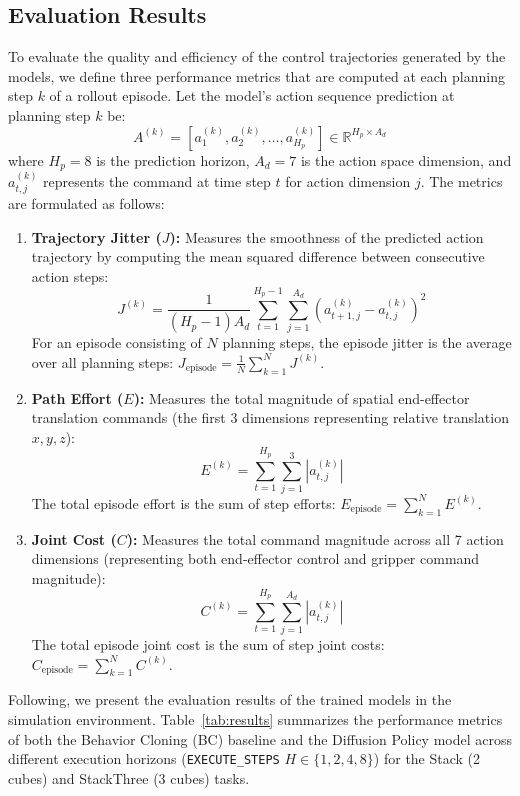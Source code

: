 \documentclass[11pt,a4paper]{article}
\begin{document}
\pagebreak

\subsection{Evaluation Results}

To evaluate the quality and efficiency of the control trajectories generated by the models, we define three performance metrics that are computed at each planning step $k$ of a rollout episode. Let the model's action sequence prediction at planning step $k$ be:
\[ A^{(k)} = \left[ a_1^{(k)}, a_2^{(k)}, \dots, a_{H_p}^{(k)} \right] \in \mathbb{R}^{H_p \times A_d} \]
where $H_p = 8$ is the prediction horizon, $A_d = 7$ is the action space dimension, and $a_{t, j}^{(k)}$ represents the command at time step $t$ for action dimension $j$. The metrics are formulated as follows:

\begin{enumerate}
    \item \textbf{Trajectory Jitter ($J$):} Measures the smoothness of the predicted action trajectory by computing the mean squared difference between consecutive action steps:
    \[ J^{(k)} = \frac{1}{(H_p - 1) A_d} \sum_{t=1}^{H_p-1} \sum_{j=1}^{A_d} \left( a_{t+1, j}^{(k)} - a_{t, j}^{(k)} \right)^2 \]
    For an episode consisting of $N$ planning steps, the episode jitter is the average over all planning steps: $J_{\text{episode}} = \frac{1}{N} \sum_{k=1}^{N} J^{(k)}$.

    \item \textbf{Path Effort ($E$):} Measures the total magnitude of spatial end-effector translation commands (the first 3 dimensions representing relative translation $x, y, z$):
    \[ E^{(k)} = \sum_{t=1}^{H_p} \sum_{j=1}^{3} \left| a_{t, j}^{(k)} \right| \]
    The total episode effort is the sum of step efforts: $E_{\text{episode}} = \sum_{k=1}^{N} E^{(k)}$.

    \item \textbf{Joint Cost ($C$):} Measures the total command magnitude across all 7 action dimensions (representing both end-effector control and gripper command magnitude):
    \[ C^{(k)} = \sum_{t=1}^{H_p} \sum_{j=1}^{A_d} \left| a_{t, j}^{(k)} \right| \]
    The total episode joint cost is the sum of step joint costs: $C_{\text{episode}} = \sum_{k=1}^{N} C^{(k)}$.
\end{enumerate}

Following, we present the evaluation results of the trained models in the simulation environment. Table~\ref{tab:results} summarizes the performance metrics of both the Behavior Cloning (BC) baseline and the Diffusion Policy model across different execution horizons (\texttt{EXECUTE\_STEPS} $H \in \{1, 2, 4, 8\}$) for the Stack (2 cubes) and StackThree (3 cubes) tasks.
\end{document}
